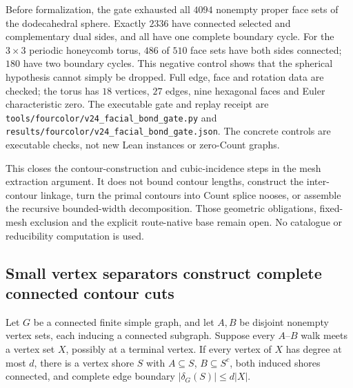 Before formalization, the gate exhausted all $4094$ nonempty proper face
sets of the dodecahedral sphere.  Exactly $2336$ have connected selected
and complementary dual sides, and all have one complete boundary cycle.
For the $3\times3$ periodic honeycomb torus, $486$ of $510$ face sets have
both sides connected; $180$ have two boundary cycles.  This negative control
shows that the spherical hypothesis cannot simply be dropped.  Full edge,
face and rotation data are checked; the torus has $18$ vertices, $27$ edges,
nine hexagonal faces and Euler characteristic zero.  The executable gate
and replay receipt are \texttt{tools/fourcolor/v24\_facial\_bond\_gate.py}
and \texttt{results/fourcolor/v24\_facial\_bond\_gate.json}.  The concrete
controls are executable checks, not new Lean instances or zero-Count graphs.

This closes the contour-construction and cubic-incidence steps in the mesh
extraction argument.  It does not bound contour lengths, construct the
inter-contour linkage, turn the primal contours into Count splice nooses,
or assemble the recursive bounded-width decomposition.  Those geometric
obligations, fixed-mesh exclusion and the explicit route-native base remain
open.  No catalogue or reducibility computation is used.

\subsection{Small vertex separators construct complete connected contour cuts}
\label{sec:contour-separator-bonds}

\begin{theorem}
Let $G$ be a connected finite simple graph, and let $A,B$ be disjoint
nonempty vertex sets, each inducing a connected subgraph.  Suppose every
$A$--$B$ walk meets a vertex set $X$, possibly at a terminal vertex.
If every vertex of $X$ has degree at most $d$, there is a vertex shore
$S$ with $A\subseteq S$, $B\subseteq S^c$, both induced shores connected,
and complete edge boundary $|\delta_G(S)|\le d|X|$.
\end{theorem}

